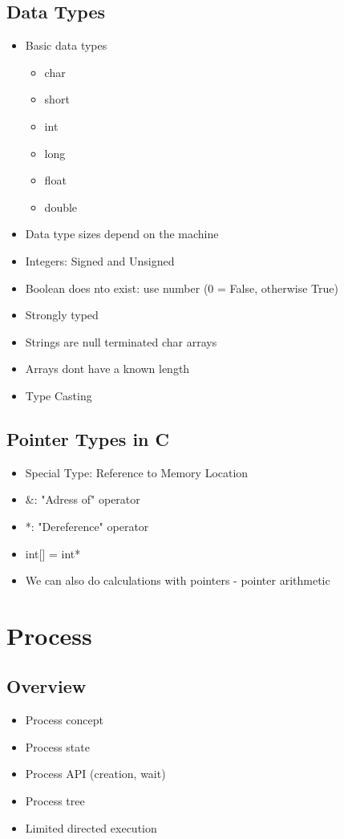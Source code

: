 \documentclass[a4paper,11pt,english]{article}
\begin{document}
\subsection*{Data Types}
\begin{itemize}
    \item {Basic data types
        \begin{itemize}
            \item char
            \item short
            \item int
            \item long
            \item float
            \item double
        \end{itemize}
    }
    \item Data type sizes depend on the machine
    \item Integers: Signed and Unsigned
    \item Boolean does nto exist: use number (0 = False, otherwise True)
    \item Strongly typed
    \item Strings are null terminated char arrays
    \item Arrays dont have a known length
    \item Type Casting
\end{itemize}

\subsection*{Pointer Types in C}
\begin{itemize}
    \item Special Type: Reference to Memory Location
    \item \&: "Adress of" operator
    \item *: "Dereference" operator
    \item int[] = int*
    \item We can also do calculations with pointers - pointer arithmetic
\end{itemize}

\section*{Process}
\subsection*{Overview}
\begin{itemize}
    \item Process concept
    \item Process state
    \item Process API (creation, wait)
    \item Process tree
    \item Limited directed execution
\end{itemize}
\end{document}
